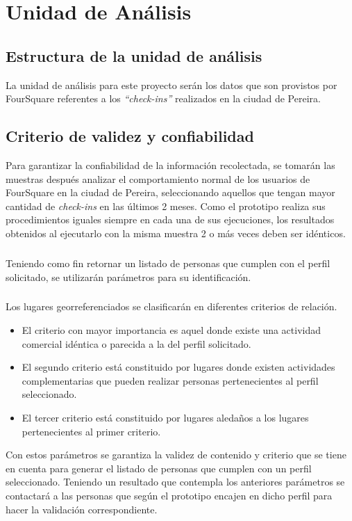\chapter{Unidad de An\'alisis}
\label{sec:analisis}
\section{Estructura de la unidad de an\'alisis}
La unidad de an\'alisis para este proyecto ser\'an los datos que son provistos por FourSquare referentes a los \textit{“check-ins”} realizados en la ciudad de Pereira.
\section{Criterio de validez y confiabilidad}
Para garantizar la confiabilidad de la informaci\'on recolectada, se tomar\'an las muestras despu\'es analizar el comportamiento normal de los usuarios de FourSquare en la ciudad de Pereira, seleccionando aquellos que tengan mayor cantidad de \textit{check-ins} en las \'ultimos 2 meses. Como el prototipo realiza sus procedimientos iguales siempre en cada una de sus ejecuciones, los resultados obtenidos al ejecutarlo con la misma muestra 2 o m\'as veces deben ser id\'enticos.
\paragraph{}
Teniendo como fin retornar un listado de personas que cumplen con  el perfil solicitado, se utilizar\'an par\'ametros para su identificaci\'on.
\paragraph{}
Los lugares georreferenciados se clasificar\'an en diferentes criterios de relaci\'on.
\begin{itemize}
\item El criterio con mayor importancia es aquel donde existe una actividad comercial id\'entica o parecida a la del perfil solicitado. 
\item El segundo criterio est\'a constituido por lugares donde existen actividades complementarias que pueden realizar personas pertenecientes al perfil seleccionado.
\item El tercer criterio est\'a constituido por lugares aleda\~nos a los lugares pertenecientes al primer criterio.
\end{itemize}
Con estos par\'ametros se garantiza la validez de contenido y criterio que se tiene en cuenta para generar el listado de personas que cumplen con un perfil seleccionado. Teniendo un resultado que contempla los anteriores par\'ametros se contactar\'a a las personas que seg\'un el prototipo encajen en dicho perfil para hacer la validaci\'on correspondiente.
\pagebreak